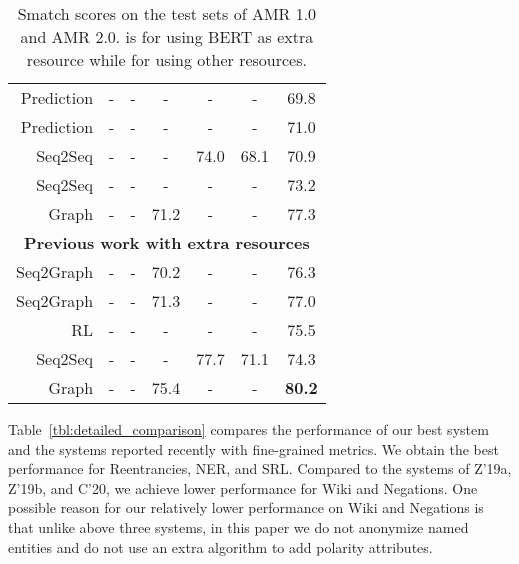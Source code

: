 \documentclass[11pt,a4paper]{article}
\begin{document}
\begin{table*}[]
\begin{tabular}{l|r|l|ccc|ccc}
        \multicolumn{3}{r|}{Prediction\small{\citep{guo_lu_emnlp_2018}}} & - & - & - & - & - & 69.8\\
        \multicolumn{3}{r|}{Prediction\small{\citep{groschwitz_etal_acl_2018}}} & - & - & - & - & - & 71.0\\
        \multicolumn{3}{r|}{Seq2Seq\small{\citep{ge_etal_ijcai_2019}}} & - & - & - & 74.0 & 68.1  & 70.9\\
        \multicolumn{3}{r|}{Seq2Seq\small{\citep{cai_lam_emnlp_2019}}} & - & - & - & - & -  & 73.2\\
        \multicolumn{3}{r|}{Graph\small{\citep{cai_lam_acl_2020}}} & - & - & 71.2 & - & -  & 77.3\\
        \hline
        \hline
        \multicolumn{9}{c}{\bf Previous work with extra resources}\\
        \hline
        \multicolumn{3}{r|}{Seq2Graph\small{\citep{zhang_etal_acl_2019}}} & - & - & 70.2 & - & - & 76.3\\
        \multicolumn{3}{r|}{Seq2Graph\small{\citep{zhang_etal_emnlp_2019}}} & - & - & 71.3 & - & - & 77.0\\
        \multicolumn{3}{r|}{RL\small{\citep{naseem_etal_acl_2019}}} & - & - & - & - & - & 75.5\\
        \multicolumn{3}{r|}{Seq2Seq\small{\citep{ge_etal_ijcai_2019}}} & - & - & - & 77.7 & 71.1  & 74.3\\
        \multicolumn{3}{r|}{Graph\small{\citep{cai_lam_acl_2020}}} & - & - & 75.4 & - & -  & \bf 80.2\\
        \hline
    \end{tabular}
    \caption{Smatch scores on the test sets of AMR 1.0 and AMR 2.0.  is for using BERT as extra resource while  for using other resources.}
    \label{tbl:performance}
\end{table*}

Table~\ref{tbl:detailed_comparison} compares the performance of our best system and the systems reported recently with fine-grained metrics. We obtain the best performance for Reentrancies, NER, and SRL. Compared to the systems of Z'19a, Z'19b, and C'20, we achieve lower performance for Wiki and Negations. One possible reason for our relatively lower performance on Wiki and Negations is that unlike above three systems, in this paper we do not anonymize named entities and do not use an extra algorithm to add polarity attributes.
\end{document}
